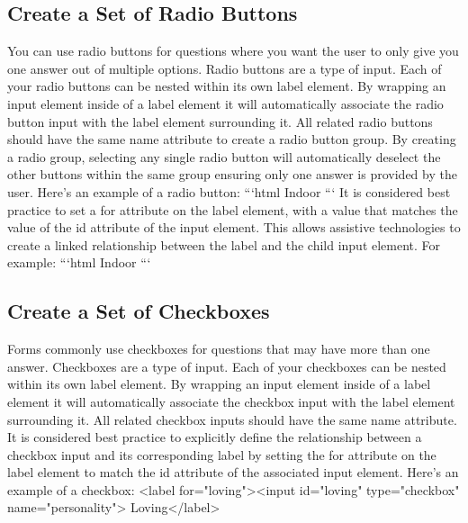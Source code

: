 \documentclass{article}%
\begin{document}
%
\subsection{Create a Set of Radio Buttons}%
\label{subsec:CreateaSetofRadioButtons}%
You can use radio buttons for questions where you want the user to only give you one answer out of multiple options.\newline%
Radio buttons are a type of input.\newline%
Each of your radio buttons can be nested within its own label element. By wrapping an input element inside of a label element it will automatically associate the radio button input with the label element surrounding it.\newline%
All related radio buttons should have the same name attribute to create a radio button group. By creating a radio group, selecting any single radio button will automatically deselect the other buttons within the same group ensuring only one answer is provided by the user.\newline%
Here's an example of a radio button:\newline%
```html\newline%
Indoor \newline%
```\newline%
It is considered best practice to set a for attribute on the label element, with a value that matches the value of the id attribute of the input element. This allows assistive technologies to create a linked relationship between the label and the child input element. For example:\newline%
```html\newline%
Indoor \newline%
```\newline%

%
\subsection{Create a Set of Checkboxes}%
\label{subsec:CreateaSetofCheckboxes}%
Forms commonly use checkboxes for questions that may have more than one answer.\newline%
Checkboxes are a type of input.\newline%
Each of your checkboxes can be nested within its own label element. By wrapping an input element inside of a label element it will automatically associate the checkbox input with the label element surrounding it.\newline%
All related checkbox inputs should have the same name attribute.\newline%
It is considered best practice to explicitly define the relationship between a checkbox input and its corresponding label by setting the for attribute on the label element to match the id attribute of the associated input element.\newline%
Here's an example of a checkbox:\newline%
<label for="loving"><input id="loving" type="checkbox" name="personality"> Loving</label>\newline%
\end{document}
